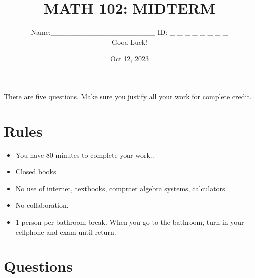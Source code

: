 \documentclass[12pt]{amsart}
\title{ MATH 102: MIDTERM }
\author{Name:\_\_\_\_\_\_\_\_\_\_\_\_\_\_\_\_\_\_\_\_ ID: \_  \_  \_   \_  \_  \_  \_  \_ 
\\   Good Luck!}
\date{Oct 12, 2023}
\begin{document}
\maketitle


There are five questions. Make sure you justify all your work for complete credit.

\section*{Rules}

\begin{itemize}[leftmargin=*]
	\item You have 80  minutes to complete your work..
	\item Closed books.
	\item No use of internet, textbooks, computer algebra systems, calculators.
	\item No collaboration.
	\item 1 person per bathroom break. When you go to the bathroom, turn in your cellphone and exam until return.
\end{itemize}

\newpage

\section*{Questions}
\end{document}
